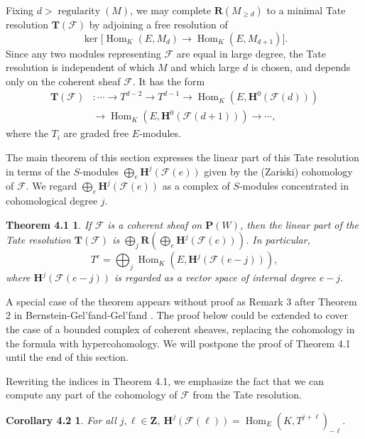 \documentclass{tran-l}
\newcommand{\reg}{\operatorname{regularity}}
\newcommand{\myHom}{\operatorname{Hom}}
\newcommand{\F}{\mathcal{F}}
\newcommand{\myH}{\mathbf{H}}
\newcommand{\myP}{\mathbf{P}}
\newcommand{\RR}{\mathbf{R}}
\newcommand{\TT}{\mathbf{T}}
\newcommand{\Z}{\mathbf{Z}}
\theoremstyle{plain}
\newtheorem*{theorem16}{Theorem 4.1}
\newtheorem*{theorem17}{Corollary 4.2}
\theoremstyle{remark}
\theoremstyle{definition}
\begin{document}
Fixing $d>\reg (M)$, we may complete $\RR (M_{\geq d})$ to
a minimal
Tate resolution $\TT (\F )$ by adjoining a free resolution of
\begin{equation*}\ker \bigl [\myHom _{K}(E,M_{d})\to \myHom _{K}(E,M_{d+1})\bigr ].
\end{equation*}
Since any two modules representing $\F $ are equal
in large degree, the Tate resolution
is independent of which $M$ and which large $d$ is chosen,
and depends only on
the coherent sheaf $\F $. It has the form
\begin{equation*}\begin{split}
\TT (\F )&: \cdots \to
T^{d-2}\to T^{d-1}\to \myHom _{K}(E, \myH ^{0}(\F (d)))\\
&\to \myHom _{K}(E, \myH ^{0}(\F (d+1)))
\to \cdots, \end{split}
\end{equation*}
where the $T_{i}$ are graded free $E$-modules.

The main theorem of this section expresses
the linear part of this Tate resolution in terms of the
$S$-modules $\bigoplus _{e} \myH ^{j}(\F (e))$ given by
the (Zariski) cohomology of $\F $. We regard
$\bigoplus _{e}\myH ^{j}(\F (e))$ as a complex of $S$-modules concentrated in
cohomological degree $j$.
\begin{theorem16}
If $\F $ is a coherent sheaf
on $\myP (W)$, then the
linear part of the Tate resolution $\TT (\F )$ is
$\bigoplus _{j} \RR (\bigoplus _{e} \myH ^{j}(\F (e)))$.
In particular,
\begin{equation*}T^{e}=\bigoplus _{j} \myHom _{K}(E,\myH ^{j}(\F (e-j))),
\end{equation*}
where $\myH ^{j}(\F (e-j))$ is regarded as a vector space of
internal degree $e-j$.
\end{theorem16}


A special case of the theorem appears without proof as Remark 3 after
Theorem 2 in Bernstein-Gel'fand-Gel'fand \cite{BGG}.
The proof below could be extended to
cover the case of a bounded complex of coherent sheaves, replacing the
cohomology in the formula with hypercohomology.
We will postpone the proof of Theorem 4.1
until the end of this section.

Rewriting the indices in Theorem 4.1, we emphasize
the fact that we can compute any part of the cohomology of $\F $
from the Tate resolution.
\begin{theorem17}
For
all $j,\ell \in \Z $,
$\myH ^{j}(\F (\ell )) = \myHom _{E}(K,T^{j+\ell })_{-\ell }.
$
\end{theorem17}
\end{document}
